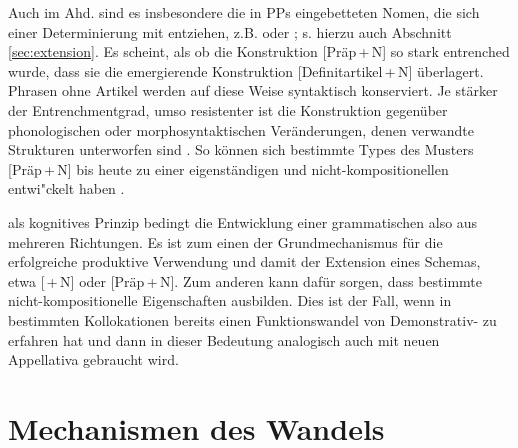 \begin{exe}
\settowidth{}
	\ex \label{ex:fuss}
	\begin{xlist}
		\ex \label{ex:denfuss}    
		\ex \label{ex:zufuss}   
	\end{xlist}
\end{exe}

Auch im Ahd. sind es insbesondere die in PPs eingebetteten Nomen, die sich einer Determinierung mit  entziehen, z.B.   oder   \parencite[84]{Oubouzar1992}; s. hierzu auch Abschnitt \ref{sec:extension}. Es scheint, als ob die Konstruktion   [Präp\,+\,N] so stark entrenched wurde, dass sie die emergierende Konstruktion  [Definitartikel\,+\,N] überlagert. Phrasen ohne Artikel werden auf diese Weise syntaktisch konserviert. Je stärker der Entrenchmentgrad,  umso resistenter ist die Konstruktion   gegenüber phonologischen oder morphosyntaktischen Veränderungen, denen verwandte Strukturen unterworfen sind \parencite[715]{Bybee2006}. So können sich bestimmte Types des Musters [Präp\,+\,N] bis heute zu einer eigenständigen und nicht-kompositionellen   entwi"ckelt haben \parencite[343--344]{Himmelmann1998}. 

 als kognitives Prinzip bedingt die Entwicklung einer grammatischen   also aus mehreren Richtungen. Es ist zum einen der Grundmechanismus für die erfolgreiche produktive Verwendung und damit der Extension eines Schemas, etwa [\,+\,N] oder [Präp\,+\,N]. Zum anderen kann  dafür sorgen, dass bestimmte  nicht-kompositionelle Eigenschaften  ausbilden. Dies ist der Fall, wenn  in bestimmten Kollokationen bereits einen Funktionswandel von Demonstrativ-  zu  erfahren hat und dann in dieser Bedeutung analogisch  auch mit neuen Appellativa  gebraucht wird. 


\section{Mechanismen des Wandels}\label{sec:mechanismen}

